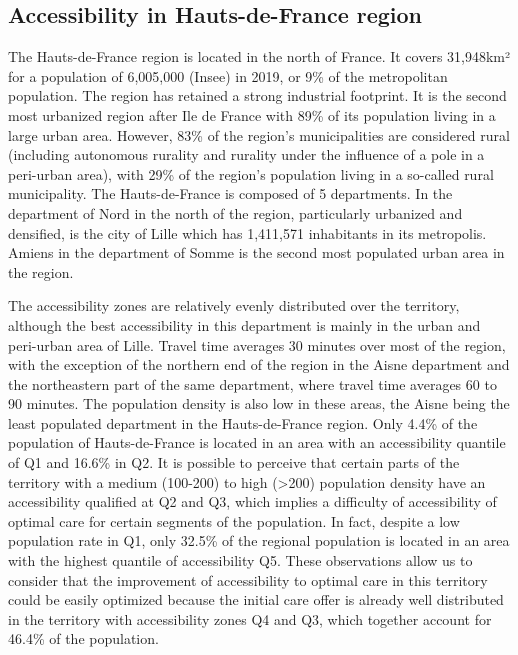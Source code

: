 \subsection*{Accessibility in Hauts-de-France region}

The Hauts-de-France region is located in the north of France. It covers
31,948km² for a population of 6,005,000 (Insee) in 2019, or 9\% of the
metropolitan population. The region has retained a strong industrial footprint.
It is the second most urbanized region after Ile de France with 89\% of its
population living in a large urban area. However, 83\% of the region's
municipalities are considered rural (including autonomous rurality and rurality
under the influence of a pole in a peri-urban area), with 29\% of the region's
population living in a so-called rural municipality. The Hauts-de-France is
composed of 5 departments. In the department of Nord in the north of the region,
particularly urbanized and densified, is the city of Lille which has 1,411,571
inhabitants in its metropolis. Amiens in the department of Somme is the second
most populated urban area in the region.

The accessibility zones are relatively evenly distributed over the territory,
although the best accessibility in this department is mainly in the urban and
peri-urban area of Lille. Travel time averages 30 minutes over most of the
region, with the exception of the northern end of the region in the Aisne
department and the northeastern part of the same department, where travel time
averages 60 to 90 minutes. The population density is also low in these areas,
the Aisne being the least populated department in the Hauts-de-France region.
Only 4.4\% of the population of Hauts-de-France is located in an area with an
accessibility quantile of Q1 and 16.6\% in Q2. It is possible to perceive that
certain parts of the territory with a medium (100-200) to high (>200) population
density have an accessibility qualified at Q2 and Q3, which implies a difficulty
of accessibility of optimal care for certain segments of the population. In
fact, despite a low population rate in Q1, only 32.5\% of the regional
population is located in an area with the highest quantile of accessibility Q5.
These observations allow us to consider that the improvement of accessibility to
optimal care in this territory could be easily optimized because the initial
care offer is already well distributed in the territory with accessibility zones
Q4 and Q3, which together account for 46.4\% of the population.

